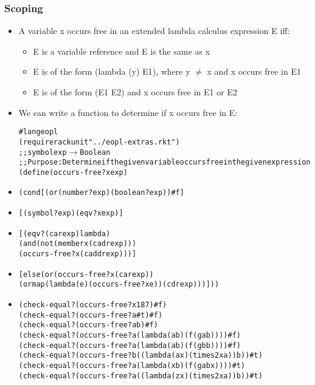 \documentclass{beamer}
\newcommand{\arrow}{\(\rightarrow\)}
\newcommand{\quot}{\texttt{\textquotesingle{}}}
\begin{document}
\begin{frame}[fragile]
\frametitle{Scoping}
\begin{scriptsize}
\begin{itemize}

\item<1-> A variable x occurs free in an extended lambda calculus expression E iff:
  \begin{itemize}
     \item \tiny{E is a variable reference and E is the same as x}
     \item E is of the form (lambda (y) E1), where y $\neq$ x and x occurs free in E1
     \item E is of the form (E1 E2) and x occurs free in E1 or E2
  \end{itemize}

\item<2-> We can write a function to determine if x occurs free in E:
\begin{alltt}
#lang eopl
(require rackunit "../eopl-extras.rkt")
;; symbol exp \arrow{} Boolean
;; Purpose: Determine if the given variable occurs free in the given expression
(define (occurs-free? x exp)
\end{alltt}

\item<3->
\begin{alltt}
  (cond	[(or (number? exp) (boolean? exp)) #f]
\end{alltt}

\item<4->
\begin{alltt}
        [(symbol? exp) (eqv? x exp)]
\end{alltt}

\item<5->
\begin{alltt}
        [(eqv? (car exp) \quot{}lambda)
         (and (not (member x (cadr exp)))
              (occurs-free? x (caddr exp)))]
\end{alltt}

\item<6->
\begin{alltt}
        [else (or (occurs-free? x (car exp))
                  (ormap (lambda (e) (occurs-free? x e)) (cdr exp)))]))
\end{alltt}

\item<2->
\begin{alltt}
(check-equal?(occurs-free? \quot{}x 187) #f)
(check-equal?(occurs-free? \quot{}a #t) #f)
(check-equal?(occurs-free? \quot{}a \quot{}b) #f)
(check-equal?(occurs-free? \quot{}a \quot{}(lambda (a b) (f (g a b)))) #f)
(check-equal?(occurs-free? \quot{}a \quot{}(lambda (a b) (f (g b b)))) #f)
(check-equal?(occurs-free? \quot{}b \quot{}((lambda (a x) (times 2 x a)) b)) #t)
(check-equal?(occurs-free? \quot{}a \quot{}(lambda (x b) (f (g a b x)))) #t)
(check-equal?(occurs-free? \quot{}a \quot{}((lambda (z x) (times 2 x a)) b)) #t)
\end{alltt}

\end{itemize}
\end{scriptsize}
\end{frame}
\end{document}
